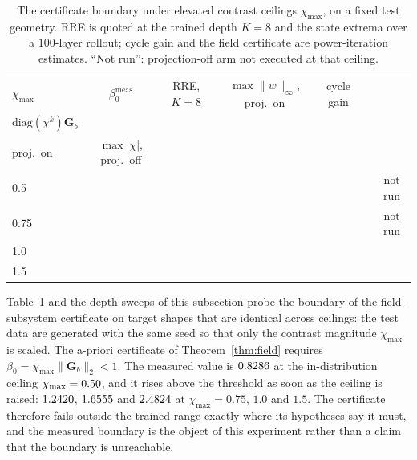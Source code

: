 \documentclass[journal,cmes,article,submit,moreauthors,pdftex]{Definitions/tsp}
\newcommand{\norm}[1]{\lVert #1 \rVert}
\newcommand{\numv}[1]{#1}
\begin{document}
\begin{table}[htbp]
\centering
\caption{The certificate boundary under elevated contrast ceilings $\chi_{\max}$, on a fixed test
geometry. RRE is quoted at the trained depth $K=8$ and the state extrema over a
$100$-layer rollout; cycle gain and the field certificate are power-iteration estimates.
``Not run'': projection-off arm not executed at that ceiling.}
\label{tab:contrast}
\small
\setlength{\tabcolsep}{4pt}
\begin{tabular}{lcccccc}
\toprule
$\chi_{\max}$ & $\beta_0^{\mathrm{meas}}$ & RRE, $K=8$ & $\max\|w\|_\infty$, proj.\ on & cycle gain & \shortstack{$\sup_k\sigma_{\max}$\\$\mathrm{diag}(\chi^k)\mathbf G_b$\\proj.\ on} & $\max|\chi|$, proj.\ off \\
\midrule
0.5  & \numv{\NumBetaZeroFive}  & \numv{\NumRreZeroFive}  & \numv{\NumMaxWZeroFive}  & \numv{\NumCycGainZeroFive}  & \numv{\NumFieldSubCertZeroFive}  & not run \\
0.75 & \numv{\NumBetaSevenFive} & \numv{\NumRreSevenFive} & \numv{\NumMaxWSevenFive} & \numv{\NumCycGainSevenFive} & \numv{\NumFieldSubCertSevenFive} & not run \\
1.0  & \numv{\NumBetaOneZero}  & \numv{\NumRreOneZero}  & \numv{\NumMaxWOneZero}  & \numv{\NumCycGainOneZero}  & \numv{\NumFieldSubCertOneZero}  & \numv{\NumProjOffChiOneZero} \\
1.5  & \numv{\NumBetaOneFive}  & \numv{\NumRreOneFive}  & \numv{\NumMaxWOneFive}  & \numv{\NumCycGainOneFive}  & \numv{\NumFieldSubCertOneFive}  & \numv{\NumProjOffChiOneFive} \\
\bottomrule
\end{tabular}
\end{table}

Table~\ref{tab:contrast} and the depth sweeps of this subsection probe the boundary of the
field-subsystem certificate on target shapes that are identical across ceilings: the test data
are generated with the same seed so that only the contrast magnitude $\chi_{\max}$ is scaled.
The a-priori certificate of Theorem~\ref{thm:field} requires
$\beta_0=\chi_{\max}\norm{\mathbf{G}_b}_2<1$. The measured value is
$\numv{\NumBetaZeroFive}$ at the in-distribution ceiling $\chi_{\max}=\numv{\NumMaxChiBox}$, and it
rises above the threshold as soon as the ceiling is raised: $\numv{\NumBetaSevenFive}$,
$\numv{\NumBetaOneZero}$ and $\numv{\NumBetaOneFive}$ at $\chi_{\max}=0.75$, $1.0$ and $1.5$. The
certificate therefore fails outside the trained range exactly where its hypotheses say it must,
and the measured boundary is the object of this experiment rather than a claim that the boundary
is unreachable.
\end{document}

